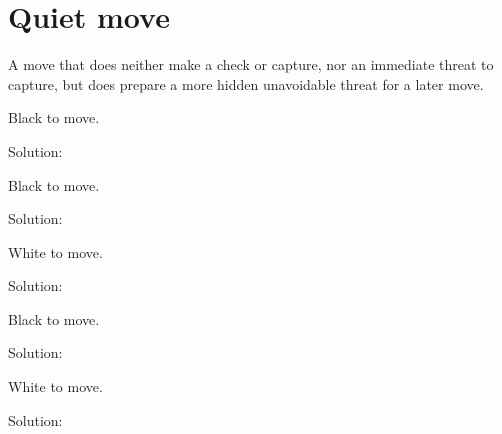 \documentclass{book}
\begin{document}
\section{Quiet move}
A move that does neither make a check or capture, nor an immediate threat to capture, but does prepare a more hidden unavoidable threat for a later move.\begin{multicols}{2} 
\begin{samepage} 
\newgame 


 
\showboard
 
 Black to move. 
 
Solution: 
 
\end{samepage}\begin{samepage} 
\newgame 


 
\showboard
 
 Black to move. 
 
Solution: 
 
\end{samepage}\begin{samepage} 
\newgame 


 
\showboard
 
 White to move. 
 
Solution: 
 
\end{samepage}\begin{samepage} 
\newgame 


 
\showboard
 
 Black to move. 
 
Solution: 
 
\end{samepage}\begin{samepage} 
\newgame 


 
\showboard
 
 White to move. 
 
Solution: 
 
\end{samepage}\end{multicols} 
\newpage 
\end{document}
